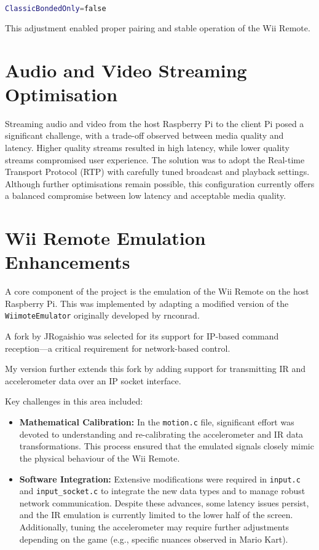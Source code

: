 \begin{lstlisting}[language=bash]
ClassicBondedOnly=false
\end{lstlisting}

This adjustment enabled proper pairing and stable operation of the Wii Remote.

\section{Audio and Video Streaming Optimisation}
Streaming audio and video from the host Raspberry Pi to the client Pi posed a significant challenge, with a trade-off observed between media quality and latency. Higher quality streams resulted in high latency, while lower quality streams compromised user experience. The solution was to adopt the Real-time Transport Protocol (RTP) with carefully tuned broadcast and playback settings. Although further optimisations remain possible, this configuration currently offers a balanced compromise between low latency and acceptable media quality.


\section{Wii Remote Emulation Enhancements}

A core component of the project is the emulation of the Wii Remote on the host Raspberry Pi. This was implemented by adapting a modified version of the \texttt{WiimoteEmulator} originally developed by rnconrad\cite{wiimote_emulator}.

A fork by JRogaishio\cite{jr_wiimote_emu} was selected for its support for IP-based command reception—a critical requirement for network-based control.

My version\cite{kf_wiimote_emu} further extends this fork by adding support for transmitting IR and accelerometer data over an IP socket interface.

Key challenges in this area included:
\begin{itemize}

	\item \textbf{Mathematical Calibration:} In the \texttt{motion.c} file, significant effort was devoted to understanding and re-calibrating the accelerometer and IR data transformations. This process ensured that the emulated signals closely mimic the physical behaviour of the Wii Remote.

	\item \textbf{Software Integration:} Extensive modifications were required in \texttt{input.c} and \texttt{input\_socket.c} to integrate the new data types and to manage robust network communication. Despite these advances, some latency issues persist, and the IR emulation is currently limited to the lower half of the screen. Additionally, tuning the accelerometer may require further adjustments depending on the game (e.g., specific nuances observed in Mario Kart).

\end{itemize}

